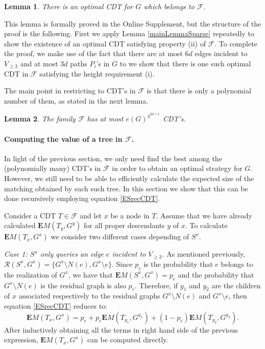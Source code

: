 \documentclass[12pt]{article}
\newtheorem{lemma}{Lemma}
\newcommand{\EMf}[2]{\mathbf{E}M(#1,#2)}
\begin{document}
	  \begin{lemma} \label{Fopt}
			There is an optimal CDT for $G$ which belongs to $\mathcal{F}$.
		\end{lemma}
		
		This lemma is formally proved in the Online Supplement, but the structure of the proof is the following. First we apply Lemma \ref{mainLemmaSparse} repeatedly to show the existence of an optimal CDT satisfying property (ii) of $\mathcal{F}$. To complete the proof, we make use of the fact that there are at most $6d$ edges incident to $V_{\ge 3}$ and at most $3d$ paths $P_i$'s in $G$ to we show that there is one such optimal CDT in $\mathcal{F}$ satisfying the height requirement (i). 
		
		The main point in restricting to CDT's in $\mathcal{F}$ is that there is only a polynomial number of them, as stated in the next lemma.
		
		\begin{lemma} 
			The family $\mathcal{F}$ has at most $e(G)^{4^{2d+1}}$ CDT's. \label{sizeF}
		\end{lemma}
		
		\paragraph{Computing the value of a tree in $\mathcal{F}$.} In light of the previous section, we only need find the best among the (polynomially many) CDT's in $\mathcal{F}$ in order to obtain an optimal strategy for $G$. However, we still need to be able to efficiently calculate the expected size of the matching obtained by each such tree. In this section we show that this can be done recursively employing equation \eqref{ESrecCDT}. 
		
		Consider a CDT $T \in \mathcal{F}$ and let $x$ be a node in $T$. Assume that we have already calculated $\EMf{T_y}{G^y}$ for all proper descendants $y$ of $x$. To calculate $\EMf{T_x}{G^x}$ we consider two different cases depending of $S^x$. 
		
		\medskip \noindent \emph{Case 1: $S^x$ only queries an edge $e$ incident to $V_{\ge 3}$.} As mentioned previously, $\mathcal{R}(S^x, G^x) = \{G^x \setminus N(e), G^x \setminus e\}$. Since $p_e$ is the probability that $e$ belongs to the realization of $G^x$, we have that $\EMf{S^x}{G^x} = p_e$ and the probability that $G^x \setminus N(e)$ is the residual graph is also $p_e$. Therefore, if $y_1$ and $y_2$ are the children of $x$ associated respectively to the residual graphs $G^x \setminus N(e)$ and $G^x \setminus e$, then equation \eqref{ESrecCDT} reduces to:
\begin{equation*}
			\EMf{T_x}{G^x} = p_e + p_e \EMf{T_{y_1}}{G^{y_1}} + (1 - p_e) \EMf{T_{y_2}}{G^{y_2}}.
		\end{equation*}
		After inductively obtaining all the terms in right hand side of the previous expression, $\EMf{T_x}{G^x}$ can be computed directly.
		
\end{document}
